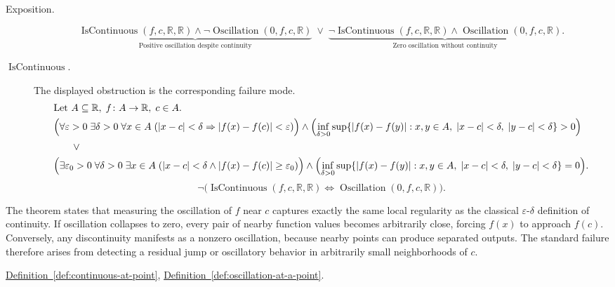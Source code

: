 \begin{remark*}
\begin{description}
  \item[Exposition.]
\[
\underbrace{\operatorname{IsContinuous}(f,c,\mathbb{R},\mathbb{R}) \land \neg \operatorname{Oscillation}(0,f,c,\mathbb{R})}_{\text{Positive oscillation despite continuity}}
\;\lor\;
\underbrace{\neg \operatorname{IsContinuous}(f,c,\mathbb{R},\mathbb{R}) \land \operatorname{Oscillation}(0,f,c,\mathbb{R})}_{\text{Zero oscillation without continuity}}.
\]


  \item[\(\operatorname{IsContinuous}.\)]
  The displayed obstruction is the corresponding failure mode.
  \[
\begin{aligned}
&\text{Let } A \subseteq \mathbb{R},\; f \colon A \to \mathbb{R},\; c \in A.\\
&\Bigl(\forall \varepsilon>0 \; \exists \delta>0 \; \forall x \in A \; (|x-c|<\delta \Rightarrow |f(x)-f(c)|<\varepsilon)\Bigr)
\land \Bigl(\inf_{\delta>0}\sup\{|f(x)-f(y)| : x,y \in A,\; |x-c|<\delta,\; |y-c|<\delta\}>0\Bigr)\\
&\qquad \lor\\
&\Bigl(\exists \varepsilon_0>0 \; \forall \delta>0 \; \exists x \in A \; (|x-c|<\delta \land |f(x)-f(c)| \ge \varepsilon_0)\Bigr)
\land \Bigl(\inf_{\delta>0}\sup\{|f(x)-f(y)| : x,y \in A,\; |x-c|<\delta,\; |y-c|<\delta\}=0\Bigr).
\end{aligned}
  \]
  \[
\neg\bigl(\operatorname{IsContinuous}(f,c,\mathbb{R},\mathbb{R}) \Longleftrightarrow \operatorname{Oscillation}(0,f,c,\mathbb{R})\bigr).
  \]
\end{description}
\end{remark*}

\begin{remark*}[Interpretation]
The theorem states that measuring the oscillation of $f$ near $c$ captures exactly the same local regularity as the classical $\varepsilon$-$\delta$ definition of continuity. If oscillation collapses to zero, every pair of nearby function values becomes arbitrarily close, forcing $f(x)$ to approach $f(c)$. Conversely, any discontinuity manifests as a nonzero oscillation, because nearby points can produce separated outputs. The standard failure therefore arises from detecting a residual jump or oscillatory behavior in arbitrarily small neighborhoods of $c$.
\end{remark*}

\begin{dependencies}
\hyperref[def:continuous-at-point]{Definition~\ref*{def:continuous-at-point}},
\hyperref[def:oscillation-at-a-point]{Definition~\ref*{def:oscillation-at-a-point}}.
\end{dependencies}

